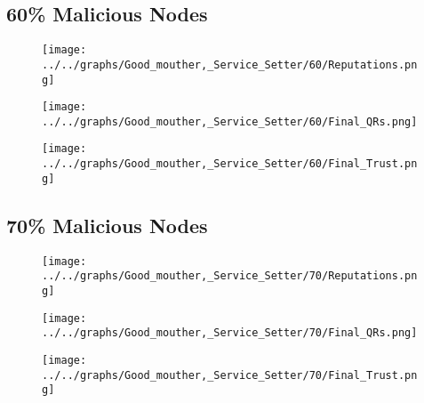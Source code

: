 \begin{minipage}[t]{0.49\columnwidth}
\subsection*{60\% Malicious Nodes}
    \begin{figure}[H]
        \centering
        \texttt{[image: ../../graphs/Good\_mouther,\_Service\_Setter/60/Reputations.png]}
    \end{figure}
    \begin{figure}[H]
        \centering
        \texttt{[image: ../../graphs/Good\_mouther,\_Service\_Setter/60/Final\_QRs.png]}
    \end{figure}
\end{minipage}
\begin{minipage}[t]{0.49\columnwidth}
    \begin{figure}[H]
        \centering
        \texttt{[image: ../../graphs/Good\_mouther,\_Service\_Setter/60/Final\_Trust.png]}
    \end{figure}
\end{minipage}

\begin{minipage}[t]{0.49\columnwidth}
\subsection*{70\% Malicious Nodes}
    \begin{figure}[H]
        \centering
        \texttt{[image: ../../graphs/Good\_mouther,\_Service\_Setter/70/Reputations.png]}
    \end{figure}
    \begin{figure}[H]
        \centering
        \texttt{[image: ../../graphs/Good\_mouther,\_Service\_Setter/70/Final\_QRs.png]}
    \end{figure}
\end{minipage}
\begin{minipage}[t]{0.49\columnwidth}
    \begin{figure}[H]
        \centering
        \texttt{[image: ../../graphs/Good\_mouther,\_Service\_Setter/70/Final\_Trust.png]}
    \end{figure}
\end{minipage}

